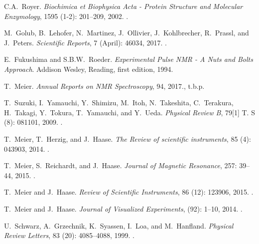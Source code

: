 \documentclass[aip,rsi,reprint,graphicx]{revtex4-1} %
\begin{document}
\begin{thebibliography}{57}
C.A.~Royer.
\newblock \emph{Biochimica et Biophysica Acta - Protein Structure and Molecular
  Enzymology}, 1595 (1-2): 201--209, 2002.
\newblock {}.

M.~Golub, B.~Lehofer, N.~Martinez, J.~Ollivier, J.~Kohlbrecher, R.~Prassl, and
  J.~Peters.
\newblock \emph{Scientific Reports}, 7 (April): 46034, 2017.
\newblock {}.

E.~Fukushima and S.B.W.~Roeder.
\newblock \emph{{Experimental Pulse NMR - A Nuts and Bolts Approach}}.
\newblock Addison Wesley, Reading, first edition, 1994.

T.~Meier.
\newblock \emph{Annual Reports on NMR Spectroscopy}, 94, 2017., t.b.p.

T.~Suzuki, I.~Yamauchi, Y.~Shimizu, M.~Itoh, N.~Takeshita, C.~Terakura,
  H.~Takagi, Y.~Tokura, T.~Yamauchi, and Y.~Ueda.
\newblock \emph{Physical Review B}, 79[1] T. S (8): 081101,
 2009.
\newblock {}.

T.~Meier, T.~Herzig, and J.~Haase.
\newblock \emph{The Review of scientific instruments}, 85
  (4): 043903, 2014.
\newblock {}.

T.~Meier, S.~Reichardt, and J.~Haase.
\newblock \emph{Journal of Magnetic Resonance}, 257: 39--44, 2015.
\newblock {}.

T.~Meier and J.~Haase.
\newblock \emph{Review of Scientific Instruments}, 86 (12):
  123906, 2015.
\newblock {}.

T.~Meier and J.~Haase.
\newblock \emph{Journal of Visualized Experiments},  (92):
  1--10, 2014.
\newblock {}.

U.~Schwarz, A.~Grzechnik, K.~Syassen, I.~Loa, and M.~Hanfland.
\newblock \emph{Physical Review Letters}, 83 (20):
  4085--4088, 1999.
\newblock {}.


\end{thebibliography}
\end{document}
